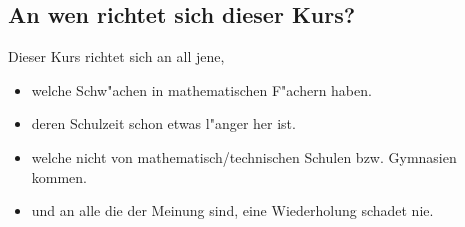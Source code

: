 \subsection{An wen richtet sich dieser Kurs?}
Dieser Kurs richtet sich an all jene,
\begin{itemize}
\item welche Schw"achen in mathematischen F"achern haben.
\item deren Schulzeit schon etwas l"anger her ist.
\item welche nicht von mathematisch/technischen Schulen bzw. Gymnasien kommen.
\item und an alle die der Meinung sind, eine Wiederholung schadet nie.
\end{itemize}